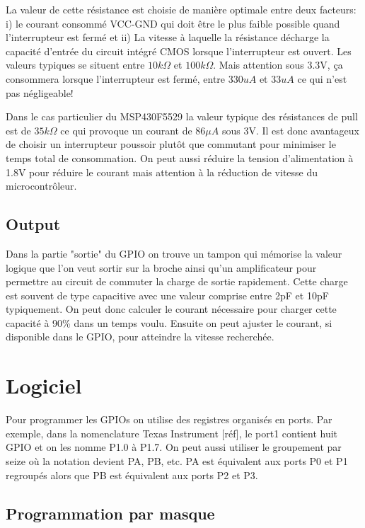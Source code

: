 La valeur de cette résistance est choisie de manière optimale entre deux facteurs: i) le courant consommé VCC-GND qui doit être le plus faible possible quand l'interrupteur est fermé et ii) La vitesse à laquelle la résistance décharge la capacité d'entrée du circuit intégré CMOS lorsque l'interrupteur est ouvert. Les valeurs typiques se situent entre $10k\Omega$ et $100k\Omega$. Mais attention sous 3.3V, ça consommera lorsque l'interrupteur est fermé, entre $330uA$ et $33uA$ ce qui n'est pas négligeable!

Dans le cas particulier du MSP430F5529 la valeur typique des résistances de pull est de $35k\Omega$ ce qui provoque un courant de $86\mu A$ sous 3V. Il est donc avantageux de choisir un interrupteur poussoir plutôt que commutant pour minimiser le temps total de consommation. On peut aussi réduire la tension d'alimentation à 1.8V pour réduire le courant mais attention à la réduction de vitesse du microcontrôleur.

\subsection{Output}

Dans la partie "sortie" du GPIO on trouve un tampon qui mémorise la valeur logique que l'on veut sortir sur la broche ainsi qu'un amplificateur pour permettre au circuit de commuter la charge de sortie rapidement. Cette charge est souvent de type capacitive avec une valeur comprise entre 2pF et 10pF typiquement. On peut donc calculer le courant nécessaire pour charger cette capacité à 90\% dans un temps voulu. Ensuite on peut ajuster le courant, si disponible dans le GPIO, pour atteindre la vitesse recherchée.

\section{Logiciel}

Pour programmer les GPIOs on utilise des registres organisés en ports. Par exemple, dans la nomenclature Texas Instrument [réf], le port1 contient huit GPIO et on les nomme P1.0 à P1.7. On peut aussi utiliser le groupement par seize où la notation devient PA, PB, etc. PA est équivalent aux ports P0 et P1 regroupés alors que PB est équivalent aux ports P2 et P3. 

\subsection{Programmation par masque}

